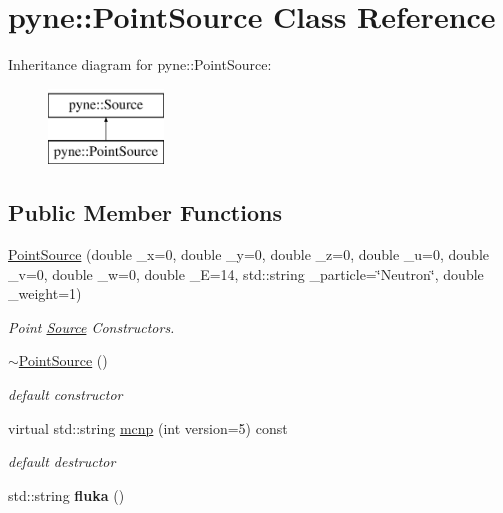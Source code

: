 \hypertarget{classpyne_1_1_point_source}{}\section{pyne\+:\+:Point\+Source Class Reference}
\label{classpyne_1_1_point_source}
Inheritance diagram for pyne\+:\+:Point\+Source\+:\begin{figure}[H]
\begin{center}
\leavevmode
\includegraphics[height=2.000000cm]{classpyne_1_1_point_source}
\end{center}
\end{figure}
\subsection*{Public Member Functions}
\begin{DoxyCompactItemize}
\item 
\mbox{\label{classpyne_1_1_point_source_acdf7dc5e644fd723e1e472f9df04313c}} 
\hyperlink{classpyne_1_1_point_source_acdf7dc5e644fd723e1e472f9df04313c}{Point\+Source} (double \+\_\+x=0, double \+\_\+y=0, double \+\_\+z=0, double \+\_\+u=0, double \+\_\+v=0, double \+\_\+w=0, double \+\_\+E=14, std\+::string \+\_\+particle=\char`\"{}Neutron\char`\"{}, double \+\_\+weight=1)
\begin{DoxyCompactList}\small\item\em Point \hyperlink{classpyne_1_1_source}{Source} Constructors. \end{DoxyCompactList}\item 
\mbox{\label{classpyne_1_1_point_source_a1046e21b47ca99f1f5d3edecc04db237}} 
\hyperlink{classpyne_1_1_point_source_a1046e21b47ca99f1f5d3edecc04db237}{$\sim$\+Point\+Source} ()
\begin{DoxyCompactList}\small\item\em default constructor \end{DoxyCompactList}\item 
\mbox{\label{classpyne_1_1_point_source_a0815187945877cc9c47e1092a5bd1fd7}} 
virtual std\+::string \hyperlink{classpyne_1_1_point_source_a0815187945877cc9c47e1092a5bd1fd7}{mcnp} (int version=5) const
\begin{DoxyCompactList}\small\item\em default destructor \end{DoxyCompactList}\item 
\mbox{\label{classpyne_1_1_point_source_a87575ad2aae28fde001e2612d43209e8}} 
std\+::string {\bfseries fluka} ()
\end{DoxyCompactItemize}
